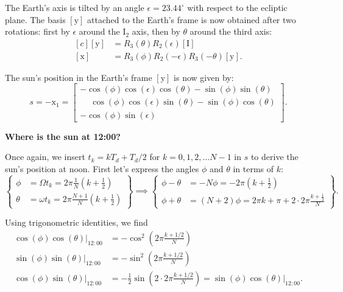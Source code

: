 \documentclass[12pt]{article}
\begin{document}
The Earth's axis is tilted by an angle $\epsilon=23.44^\circ$ with respect to
the ecliptic plane. The basis $[\mathrm{y}]$ attached to the Earth's frame is 
now obtained after two rotations: first by $\epsilon$ around the $\mathrm{I}_2$ 
axis, then by $\theta$ around the third axis:
\begin{equation}
    \begin{aligned}[c]
        [ \mathrm{y} ] &= R_3(\theta) R_2(\epsilon) [\mathrm{I}] \\
        [ \mathrm{x} ] &= R_3(\phi) R_2(-\epsilon) R_3(-\theta)[\mathrm{y}].
    \end{aligned}
\end{equation}

The sun's position in the Earth's frame $[\mathrm{y}]$ is now given by:
\begin{equation}
    s = -\mathrm{x}_1 =
    \begin{bmatrix}
        -\cos(\phi)\cos(\epsilon)\cos(\theta) - \sin(\phi)\sin(\theta)\\
        \phantom{+}\cos(\phi)\cos(\epsilon)\sin(\theta)-\sin(\phi) \cos(\theta)\\
        -\cos(\phi)\sin(\epsilon)\phantom{\sin(\theta)+\sin(\phi) \cos(\theta)}
    \end{bmatrix}.
    \label{eq:position}
\end{equation}

\textbf{Where is the sun at 12:00?}

Once again, we insert $t_{k}=kT_d+T_d/2$ for $k=0,1,2,\ldots N-1$ in $s$ to 
derive the sun's position at noon. First let's express the angles $\phi$ and 
$\theta$ in terms of $k$:
\begin{equation}
    \left\{
    \begin{aligned}
        \phi &= \Omega t_{k} = 2\pi \frac{1}{N} (k+\tfrac{1}{2})\\
        \theta &= \omega t_{k} = 2\pi \frac{N+1}{N} (k+\tfrac{1}{2})
    \end{aligned}
    \right\} \implies
    \left\{
    \begin{aligned}
        \phi-\theta &= -N\phi = -2\pi (k+\tfrac{1}{2})\\
        \phi+\theta &= (N+2)\phi = 2\pi k + \pi + 2\cdot 2\pi \frac{k+\tfrac{1}{2}}{N}
    \end{aligned}
    \right\}.
\end{equation}

Using trigonometric identities, we find
\begin{equation}
    \begin{aligned}
        \cos(\phi)\cos(\theta)\vert_{12:00} &= -\cos^2\left(2\pi \frac{k+1/2}{N}\right)\\
        \sin(\phi)\sin(\theta)\vert_{12:00} &= -\sin^2\left(2\pi \frac{k+1/2}{N}\right)\\
        \cos(\phi)\sin(\theta)\vert_{12:00} &= -\frac{1}{2} \sin(2\cdot 2\pi \frac{k+1/2}{N})
        = \sin(\phi)\cos(\theta)\vert_{12:00}.
    \end{aligned}
\end{equation}
\end{document}
